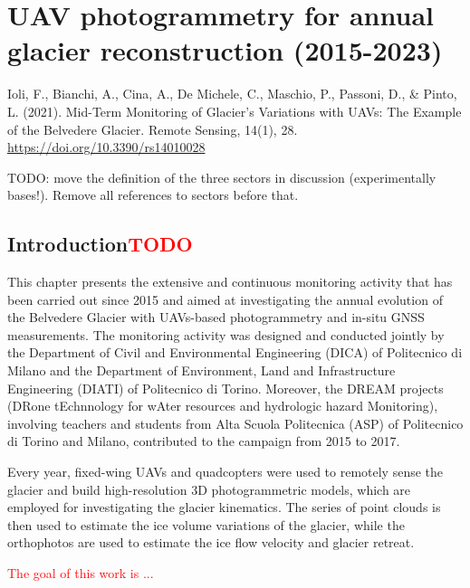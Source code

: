 \graphicspath{{figures/chapter3/}}
\onehalfspacing

\chapter{UAV photogrammetry for annual glacier reconstruction (2015-2023)}\label{ch:3}

\vfill


\noindent Ioli, F., Bianchi, A., Cina, A., De Michele, C., Maschio, P., Passoni, D., \&
Pinto, L. (2021). Mid-Term Monitoring of Glacier’s Variations with UAVs: The Example of
the Belvedere Glacier. Remote Sensing, 14(1), 28.
\url{https://doi.org/10.3390/rs14010028}

\newpage

{\color{red} TODO: move the definition of the three sectors in discussion (experimentally bases!). Remove all references to sectors before that.}


\section{Introduction\textcolor{red}{TODO}}\label{sec:3:intro}

This chapter presents the extensive and continuous monitoring activity that has been carried out since 2015
and aimed at investigating the annual evolution of the Belvedere Glacier with UAVs-based photogrammetry and in-situ GNSS measurements.
The monitoring activity was designed and conducted jointly by the Department of Civil and Environmental Engineering (DICA) 
of Politecnico di Milano and the Department of Environment, Land and Infrastructure Engineering (DIATI) of Politecnico di Torino. 
Moreover, the DREAM projects (DRone tEchnnology for wAter resources and hydrologic hazard Monitoring), 
involving teachers and students from Alta Scuola Politecnica (ASP) of Politecnico di Torino and Milano, 
contributed to the campaign from 2015 to 2017.

Every year, fixed-wing UAVs and quadcopters were used to remotely sense the glacier and build 
high-resolution 3D photogrammetric models, which are employed for investigating the glacier kinematics.
The series of point clouds is then used to estimate the ice volume variations of the glacier, while the orthophotos
are used to estimate the ice flow velocity and glacier retreat. 


\textcolor{red}{The goal of this work is ...}


